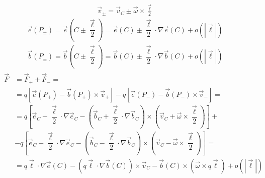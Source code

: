 \documentclass[letterpaper,10pt,english]{jupyterBook}
\begin{document}
\sphinxAtStartPar
{}
\begin{equation*}
\begin{split}\vec{v}_{\pm} = \vec{v}_C \pm \vec{\omega} \times \frac{\vec{\ell}}{2}\end{split}
\end{equation*}\begin{equation*}
\begin{split}\vec{e}(P_{\pm}) = \vec{e}\left( C \pm \dfrac{\vec{\ell}}{2} \right) = \vec{e}(C) \pm \dfrac{\vec{\ell}}{2} \cdot \nabla \vec{e}(C) + o(|\vec{\ell}|)\end{split}
\end{equation*}\begin{equation*}
\begin{split}\vec{b}(P_{\pm}) = \vec{b}\left( C \pm \dfrac{\vec{\ell}}{2} \right) = \vec{b}(C) \pm \dfrac{\vec{\ell}}{2} \cdot \nabla \vec{b}(C) + o(|\vec{\ell}|)\end{split}
\end{equation*}
\sphinxAtStartPar
{}
\begin{equation*}
\begin{split}\begin{aligned}
  \vec{F} & = \vec{F}_+ + \vec{F}_- = \\
   & = q \left[ \vec{e}(P_+) - \vec{b}(P_+) \times \vec{v}_{+} \right] - q \left[ \vec{e}(P_-) - \vec{b}(P_-) \times \vec{v}_{-} \right] = \\
   & = q \left[ \vec{e}_C + \dfrac{\vec{\ell}}{2} \cdot \nabla \vec{e}_C - \left( \vec{b}_C + \dfrac{\vec{\ell}}{2} \cdot \nabla \vec{b}_C \right) \times \left( \vec{v}_C + \vec{\omega} \times \dfrac{\vec{\ell}}{2} \right) \right] + \\ 
   & - q \left[ \vec{e}_C - \dfrac{\vec{\ell}}{2} \cdot \nabla \vec{e}_C - \left( \vec{b}_C - \dfrac{\vec{\ell}}{2} \cdot \nabla \vec{b}_C \right) \times \left( \vec{v}_C - \vec{\omega} \times \dfrac{\vec{\ell}}{2} \right) \right] = \\
   & = q \vec{\ell} \cdot \nabla \vec{e}(C) - \left( q \vec{\ell} \cdot \nabla \vec{b}(C) \right) \times \vec{v}_C - \vec{b}(C) \times \left(  \vec{\omega} \times q \vec{\ell} \right) + o(|\vec{\ell}|)
\end{aligned}\end{split}
\end{equation*}
\sphinxAtStartPar
{}
\end{document}
